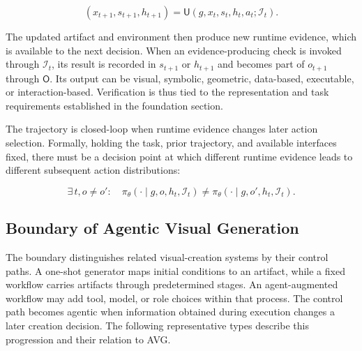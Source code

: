 \begin{equation}
  (x_{t+1},s_{t+1},h_{t+1})
  = \mathsf{U}\!\left(g,x_t,s_t,h_t,a_t;\mathcal{I}_t\right).
\end{equation}

The updated artifact and environment then produce new runtime evidence, which is available to the next decision. When an evidence-producing check is invoked through $\mathcal{I}_t$, its result is recorded in $s_{t+1}$ or $h_{t+1}$ and becomes part of $o_{t+1}$ through $\mathsf{O}$. Its output can be visual, symbolic, geometric, data-based, executable, or interaction-based. Verification is thus tied to the representation and task requirements established in the foundation section.

The trajectory is closed-loop when runtime evidence changes later action selection. Formally, holding the task, prior trajectory, and available interfaces fixed, there must be a decision point at which different runtime evidence leads to different subsequent action distributions:

\begin{equation}
  \exists\,t,o\ne o':\quad
  \pi_{\theta}\!\left(\cdot\mid g,o,h_t,\mathcal{I}_t\right)
  \ne
  \pi_{\theta}\!\left(\cdot\mid g,o',h_t,\mathcal{I}_t\right).
\end{equation}

\subsection{Boundary of Agentic Visual Generation}
\label{sec:agentic-visual-generation-boundary}

The boundary distinguishes related visual-creation systems by their control paths. A one-shot generator maps initial conditions to an artifact, while a fixed workflow carries artifacts through predetermined stages. An agent-augmented workflow may add tool, model, or role choices within that process. The control path becomes agentic when information obtained during execution changes a later creation decision. The following representative types describe this progression and their relation to AVG.

